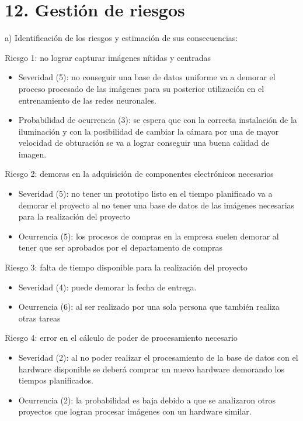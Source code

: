 \documentclass[11pt]{charter}
\begin{document}



\section{12. Gestión de riesgos}
\label{sec:riesgos}

a) Identificación de los riesgos y estimación de sus consecuencias:

Riesgo 1: no lograr capturar imágenes nítidas y centradas
\begin{itemize}
\item Severidad (5): no conseguir una base de datos uniforme va a demorar el proceso procesado de las imágenes para su posterior utilización en el entrenamiento de las redes neuronales.
\item Probabilidad de ocurrencia (3): se espera que con la correcta instalación de la iluminación y con la posibilidad de cambiar la cámara por una de mayor velocidad de obturación se va a lograr conseguir una buena calidad de imagen.  
\end{itemize}   

Riesgo 2: demoras en la adquisición de componentes electrónicos necesarios
\begin{itemize}
\item Severidad (5): no tener un prototipo listo en el tiempo planificado va a demorar el proyecto al no tener una base de datos de las imágenes necesarias para la realización del proyecto 
\item Ocurrencia (5): los procesos de compras en la empresa suelen demorar al tener que ser aprobados por el departamento de compras
\end{itemize}

Riesgo 3: falta de tiempo disponible para la realización del proyecto

\begin{itemize}
\item Severidad (4): puede demorar la fecha de entrega.
\item Ocurrencia (6): al ser realizado por una sola persona que también realiza otras tareas
\end{itemize}

Riesgo 4: error en el cálculo de poder de procesamiento necesario
\begin{itemize}
\item Severidad (2): al no poder realizar el procesamiento de la base de datos con el hardware disponible se deberá comprar un nuevo hardware demorando los tiempos planificados.  
\item Ocurrencia (2): la probabilidad es baja debido a que se analizaron otros proyectos que logran procesar imágenes con un hardware similar. 
\end{itemize}
\end{document}
